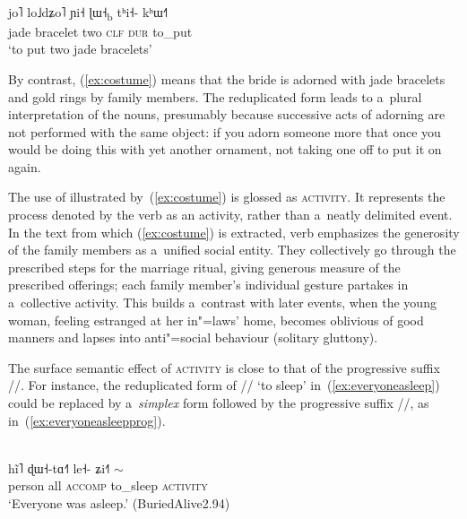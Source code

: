 \begin{exe}
	\ex
	\label{ex:putsimple}
	\\
	\gll jo˥	lo˩dʑo˥		ɲi˧		ɭɯ˧\textsubscript{b}	tʰi˧-		kʰɯ˧˥\\
	jade	bracelet	two		\textsc{clf}	\textsc{dur}		to\_put\\
	\glt ‘to put two jade bracelets’
\end{exe}

By contrast, (\ref{ex:costume}) means that the bride is adorned with jade bracelets and gold rings by family members. The reduplicated form leads to a~plural interpretation of the nouns, presumably because successive acts of adorning are not performed with the same object: if you adorn someone more that once you would be doing this with yet another ornament, not taking one off to put it on again. 

The use of  illustrated by~(\ref{ex:costume}) is glossed as \textsc{activity}. It represents the process denoted by the verb as an activity, rather than a~neatly delimited event. In the text from which (\ref{ex:costume}) is extracted, verb  emphasizes the generosity of the family members as a~unified social entity. They collectively go through the prescribed steps for the marriage ritual, giving generous measure of the prescribed offerings; each family member's individual gesture partakes in a~collective activity. This builds a~contrast with later events, when the young woman, feeling estranged at her in"=laws’ home, becomes oblivious of good manners and lapses into anti"=social behaviour (solitary gluttony).

The surface semantic effect of \textsc{activity} is close to that of the {progressive} suffix //. For instance, the reduplicated form of // ‘to sleep’ in~(\ref{ex:everyoneasleep}) could be replaced by a~\textit{simplex} form followed by the {progressive} suffix //, as in~(\ref{ex:everyoneasleepprog}). 

\begin{exe}
	\ex
	\label{ex:everyoneasleep}
	\\
	\gll hĩ˥		ɖɯ˧-tɑ˧˥	le˧-			ʑi˧˥	{$\sim$}\\
	person		all		\textsc{accomp}		to\_sleep	\textsc{activity}\\
	\glt ‘Everyone was asleep.’ (BuriedAlive2.94)
\end{exe}

